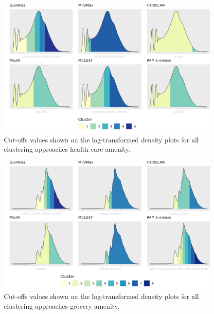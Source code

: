 \documentclass[11pt, a4paper]{article}
\begin{document}
\begin{figure}[H]
\centering
\includegraphics[width=\textwidth]{./cutoffs/by_amenity/Health care_cutoffs.png}
\caption[Health care cutoffs]{Cut-offs values shown on the log-transformed density plots for all clustering approaches health care amenity.}\label{healthcarecutoffs}
\end{figure}










\begin{figure}[H]
\centering
\includegraphics[width=\textwidth]{./cutoffs/by_amenity/Grocery_cutoffs.png}
\caption[Grocery cutoffs]{Cut-offs values shown on the log-transformed density plots for all clustering approaches grocery amenity.}\label{grocerycutoffs}
\end{figure}
\end{document}
